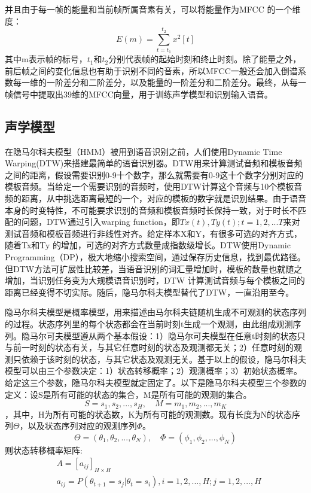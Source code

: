 并且由于每一帧的能量和当前帧所属音素有关，可以将能量作为MFCC 的一个维度：\begin{equation}E(m) = \sum_{t=t_1}^{t_2} x^2[t]\end{equation}
其中m表示帧的标号，$t_1$和$t_2$分别代表帧的起始时刻和终止时刻。除了能量之外，前后帧之间的变化信息也有助于识别不同的音素，所以MFCC一般还会加入倒谱系数每一维的一阶差分和二阶差分，以及能量的一阶差分和二阶差分。最终，从每一帧信号中提取出39维的MFCC向量，用于训练声学模型和识别输入语音。
\subsection{声学模型}\label{acoustic model introduction}
在隐马尔科夫模型（HMM）被用到语音识别之前，人们使用Dynamic Time Warping(DTW)\cite{sakoe1978dynamic}来搭建最简单的语音识别器。DTW用来计算测试音频和模板音频之间的距离，假设需要识别0-9十个数字，那么就需要有0-9这十个数字分别对应的模板音频。当给定一个需要识别的音频时，使用DTW计算这个音频与10个模板音频的距离，从中挑选距离最短的一个，对应的模板的数字就是识别结果。由于语音本身的时变特性，不可能要求识别的音频和模板音频时长保持一致，对于时长不匹配的问题，DTW通过引入warping function，即$Tx(t), Ty(t);t=1,2,...T$来对测试音频和模板音频进行非线性对齐。给定样本X和Y，有很多可选的对齐方式，随着Tx和Ty 的增加，可选的对齐方式数量成指数级增长。DTW使用Dynamic Programming（DP），极大地缩小搜索空间，通过保存历史信息，找到最优路径。但DTW方法可扩展性比较差，当语音识别的词汇量增加时，模板的数量也就随之增加，当识别任务变为大规模语音识别时，DTW 计算测试音频与每个模板之间的距离已经变得不切实际。随后，隐马尔科夫模型替代了DTW，一直沿用至今。

隐马尔科夫模型是概率模型，用来描述由马尔科夫链随机生成不可观测的状态序列的过程。状态序列里的每个状态都会在当前时刻t生成一个观测，由此组成观测序列。隐马尔可夫模型遵从两个基本假设：1）隐马尔可夫模型在任意t时刻的状态只与前一时刻的状态有关，与其它任意时刻的状态及观测都无关；2）任意时刻的观测只依赖于该时刻的状态，与其它状态及观测无关。基于以上的假设，隐马尔科夫模型可以由三个参数决定：1）状态转移概率；2）观测概率；3）初始状态概率。给定这三个参数，隐马尔科夫模型就定固定了。以下是隐马尔科夫模型三个参数的定义：设S是所有可能的状态的集合，M是所有可能的观测的集合。$$S={s_1,s_2,...,s_H}, \quad M={m_1,m_2,...,m_K}$$，其中，H为所有可能的状态数，K为所有可能的观测数。现有长度为N的状态序列$\Theta$，以及状态序列对应的观测序列$\Phi$。$$\Theta=(\theta_1,\theta_2,...,\theta_N), \quad \Phi=(\phi_1,\phi_2,...,\phi_N)$$则状态转移概率矩阵:
\begin{eqnarray}
  &A=[a_{ij}]_{H\times H} \\
  &a_{ij} = P(\theta_{t+1}=s_j | \theta_t=s_i), i=1,2,...,H; j=1,2,...,H
\end{eqnarray}


